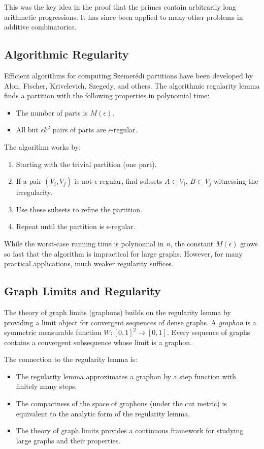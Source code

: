 This was the key idea in the proof that the primes contain arbitrarily long arithmetic progressions. It has since been applied to many other problems in additive combinatorics.

\subsection{Algorithmic Regularity}

Efficient algorithms for computing Szemer\'edi partitions have been developed by Alon, Fischer, Krivelevich, Szegedy, and others. The algorithmic regularity lemma finds a partition with the following properties in polynomial time:
\begin{itemize}
\item The number of parts is $M(\epsilon)$.
\item All but $\epsilon k^2$ pairs of parts are $\epsilon$-regular.
\end{itemize}

The algorithm works by:
\begin{enumerate}
\item Starting with the trivial partition (one part).
\item If a pair $(V_i, V_j)$ is not $\epsilon$-regular, find subsets $A \subset V_i$, $B \subset V_j$ witnessing the irregularity.
\item Use these subsets to refine the partition.
\item Repeat until the partition is $\epsilon$-regular.
\end{enumerate}

While the worst-case running time is polynomial in $n$, the constant $M(\epsilon)$ grows so fast that the algorithm is impractical for large graphs. However, for many practical applications, much weaker regularity suffices.

\subsection{Graph Limits and Regularity}

The theory of graph limits (graphons) builds on the regularity lemma by providing a limit object for convergent sequences of dense graphs. A \emph{graphon} is a symmetric measurable function $W: [0,1]^2 \to [0,1]$. Every sequence of graphs contains a convergent subsequence whose limit is a graphon.

The connection to the regularity lemma is:
\begin{itemize}
\item The regularity lemma approximates a graphon by a step function with finitely many steps.
\item The compactness of the space of graphons (under the cut metric) is equivalent to the analytic form of the regularity lemma.
\item The theory of graph limits provides a continuous framework for studying large graphs and their properties.
\end{itemize}

